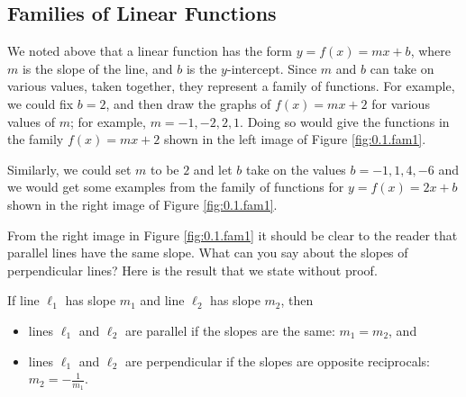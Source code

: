 \ea
\afterex


\subsection*{Families of Linear Functions}
We noted above that a linear function has the form  $y=f(x)=mx+b$, where $m$ is the slope of
the line, and $b$ is the $y$-intercept.  Since $m$ and $b$ can take on various values, taken
together, they represent a family of functions.  For example, we could fix $b = 2$, and then
draw the graphs of $f(x)=mx+2$ for various values of $m$; for example, $m = -1, -2, 2, 1$.
Doing so would give the functions in the family $f(x)=mx+2$ shown in the left image of Figure
\ref{fig:0.1.fam1}.

Similarly, we could set $m$ to be $2$ and let $b$ take on the values $b=-1, 1, 4, -6$ and
we would get
some examples from the family of functions for $y=f(x)=2x+b$ shown in the right image of Figure
\ref{fig:0.1.fam1}.


From the right image in Figure \ref{fig:0.1.fam1} it should be clear to the reader that
parallel lines have the same slope.  What can you say about the slopes of perpendicular
lines?  Here is the result that we state without proof.
\begin{theorem}\label{thm:test}
If line $\ell_1$ has slope $m_1$ and line $\ell_2$ has slope $m_2$, then 
    \begin{itemize}
        \item lines $\ell_1$ and $\ell_2$ are parallel if the slopes are the same: $m_1 = m_2$,
            and
        \item lines $\ell_1$ and $\ell_2$ are perpendicular if the slopes are opposite
            reciprocals: $m_2 = -\frac{1}{m_1}$.
    \end{itemize}
\end{theorem}

